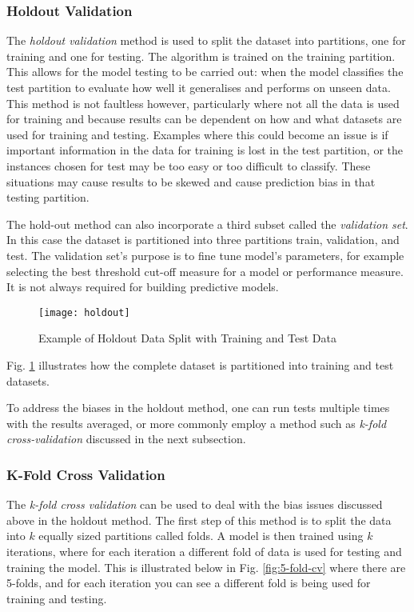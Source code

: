 \subsubsection{Holdout Validation}
The \textit{holdout validation} method is used to split the dataset into partitions, one for training and one for testing. The algorithm is trained on the training partition. This allows for the model testing to be carried out: when the model classifies the test partition to evaluate how well it generalises and performs on unseen data. This method is not faultless however, particularly where not all the data is used for training and because results can be dependent on how and what datasets are used for training and testing. Examples where this could become an issue is if important information in the data for training is lost in the test partition, or the instances chosen for test may be too easy or too difficult to classify. These situations may cause results to be skewed and cause prediction bias in that testing partition.

The hold-out method can also incorporate a third subset called the \textit{validation set}. In this case the dataset is partitioned into three partitions train, validation, and test. The validation set's purpose is to fine tune model's parameters, for example selecting the best threshold cut-off measure for a model or performance measure. It is not always required for building predictive models. 

\begin{figure}[H]
	\texttt{[image: holdout]}
	\caption{Example of Holdout Data Split with Training and Test Data}
	\label{fig:holdout}
\end{figure}

Fig. \ref{fig:holdout} illustrates how the complete dataset is partitioned into training and test datasets. 

To address the biases in the holdout method, one can run tests multiple times with the results averaged, or more commonly employ a method such as \textit{k-fold cross-validation} discussed in the next subsection.

\subsubsection{K-Fold Cross Validation}\label{subsec:k_fold}
The \textit{k-fold cross validation} can be used to deal with the bias issues discussed above in the holdout method. The first step of this method is to split the data into $k$ equally sized partitions called folds. A model is then trained using $k$ iterations, where for each iteration a different fold of data is used for testing and training the model. This is illustrated below in Fig. \ref{fig:5-fold-cv} where there are 5-folds, and for each iteration you can see a different fold is being used for training and testing.  

